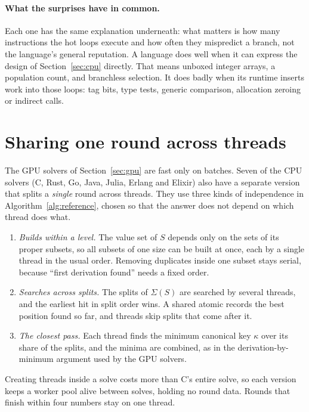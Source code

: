 \documentclass[11pt,a4paper]{article}
\theoremstyle{definition}
\theoremstyle{remark}
\begin{document}
\paragraph{What the surprises have in common.}
Each one has the same explanation underneath: what matters is how many instructions the hot loops execute
and how often they mispredict a branch, not the language's general reputation. A language does well when
it can express the design of Section~\ref{sec:cpu} directly. That means unboxed integer arrays, a population
count, and branchless selection. It does badly when its runtime inserts work into those loops: tag bits,
type tests, generic comparison, allocation zeroing or indirect calls.

\section{Sharing one round across threads}\label{sec:parallel}

The GPU solvers of Section~\ref{sec:gpu} are fast only on batches. Seven of the CPU solvers (C, Rust, Go,
Java, Julia, Erlang and Elixir) also have a separate version that splits a \emph{single} round across
threads. They use three kinds of independence in Algorithm~\ref{alg:reference}, chosen so that the answer
does not depend on which thread does what.
\begin{enumerate}[label=(\roman*)]
\item \emph{Builds within a level.} The value set of $S$ depends only on the sets of its proper subsets, so
all subsets of one size can be built at once, each by a single thread in the usual order. Removing
duplicates inside one subset stays serial, because ``first derivation found'' needs a fixed order.
\item \emph{Searches across splits.} The splits of $\Sigma(S)$ are searched by several threads, and the
earliest hit in split order wins. A shared atomic records the best position found so far, and threads skip
splits that come after it.
\item \emph{The closest pass.} Each thread finds the minimum canonical key $\kappa$ over its share of the
splits, and the minima are combined, as in the derivation-by-minimum argument used by the GPU solvers.
\end{enumerate}
Creating threads inside a solve costs more than C's entire solve, so each version keeps a worker pool alive
between solves, holding no round data. Rounds that finish within four numbers stay on one thread.
\end{document}
